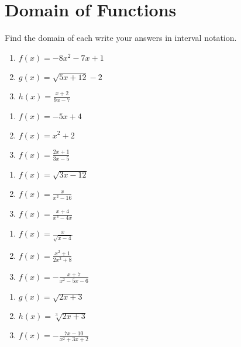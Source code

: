 \section{Domain of Functions}

Find the domain of each write your answers in interval notation.
\begin{multicols}{3}
\begin{enumerate}
	\item $f(x) = -8x^2 - 7x + 1$
	\item $g(x) = \sqrt{5x+12}-2$
	\item $h(x) = \frac{x+2}{9x-7}$
\end{enumerate}	\setcounter{Review}{\value{enumi}}
\end{multicols}
\begin{multicols}{3}
\begin{enumerate}	\setcounter{enumi}{\value{Review}}
	\item $f(x) = -5x + 4$
	\item $f(x) = x^2 + 2$
	\item $f(x) = \frac{2x+1}{3x-5}$
\end{enumerate}	\setcounter{Review}{\value{enumi}}
\end{multicols}
\begin{multicols}{3}
\begin{enumerate}	\setcounter{enumi}{\value{Review}}
	\item $f(x) = \sqrt{3x-12}$
	\item $f(x) = \frac{x}{x^2-16}$
	\item $f(x) = \frac{x+4}{x^3-4x}$
\end{enumerate}	\setcounter{Review}{\value{enumi}}
\end{multicols}
\begin{multicols}{3}
\begin{enumerate}	\setcounter{enumi}{\value{Review}}
	\item $f(x) = \frac{x}{\sqrt{x-4}}$
	\item $f(x) = \frac{x^2+1}{2x^2+8}$
	\item $f(x) = -\frac{x+7}{x^2-5x-6}$
\end{enumerate}	\setcounter{Review}{\value{enumi}}
\end{multicols}
\begin{multicols}{3}
\begin{enumerate}	\setcounter{enumi}{\value{Review}}
	\item $g(x) = \sqrt{2x+3}$
	\item $h(x) = \sqrt[3]{2x+3}$
	\item $f(x) = -\frac{7x-10}{x^2+3x+2}$
\end{enumerate}	\setcounter{Review}{\value{enumi}}
\end{multicols}

